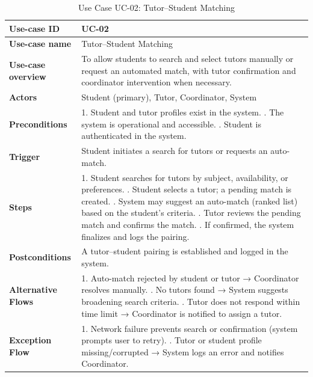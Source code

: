 \begin{table}[h!]
\centering
\begin{tabular}{|p{3cm}|p{11cm}|}
\hline
\textbf{Use-case ID} & UC-02 \\
\hline
\textbf{Use-case name} & Tutor--Student Matching \\
\hline
\textbf{Use-case overview} & To allow students to search and select tutors manually or request an automated match, with tutor confirmation and coordinator intervention when necessary. \\
\hline
\textbf{Actors} & Student (primary), Tutor, Coordinator, System \\
\hline
\textbf{Preconditions} & 
1. Student and tutor profiles exist in the system. \newline
2. The system is operational and accessible. \newline
3. Student is authenticated in the system. \\
\hline
\textbf{Trigger} & Student initiates a search for tutors or requests an auto-match. \\
\hline
\textbf{Steps} &
1. Student searches for tutors by subject, availability, or preferences. \newline
2. Student selects a tutor; a pending match is created. \newline
3. System may suggest an auto-match (ranked list) based on the student's criteria. \newline
4. Tutor reviews the pending match and confirms the match. \newline
5. If confirmed, the system finalizes and logs the pairing. \\
\hline
\textbf{Postconditions} & A tutor--student pairing is established and logged in the system. \\
\hline
\textbf{Alternative Flows} & 
1. Auto-match rejected by student or tutor → Coordinator resolves manually. \newline
2. No tutors found → System suggests broadening search criteria. \newline
3. Tutor does not respond within time limit → Coordinator is notified to assign a tutor. \\
\hline
\textbf{Exception Flow} & 
1. Network failure prevents search or confirmation (system prompts user to retry). \newline
2. Tutor or student profile missing/corrupted → System logs an error and notifies Coordinator. \\
\hline
\end{tabular}
\caption{Use Case UC-02: Tutor--Student Matching}
\end{table}
